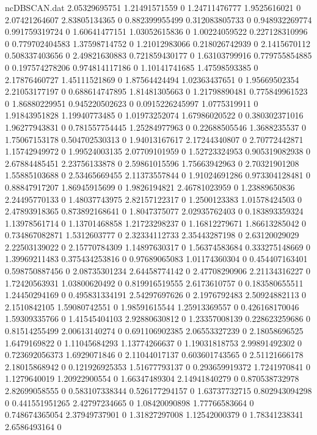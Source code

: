 \begin{filecontents}{ncDBSCAN.dat}
2.05329695751 1.21491571559 0
1.24711476777 1.9525616021 0
2.07421264607 2.83805134365 0
0.882399955499 0.312083805733 0
0.948932269774 0.991759319724 0
1.60641477151 1.03052615836 0
1.00224059522 0.227128310996 0
0.779702404583 1.37598714752 0
1.21012983066 0.218026742939 0
2.1415670112 0.508337403656 0
2.49821630883 0.721859430177 0
1.63103799916 0.779755854885 0
0.197574278206 0.974814117186 0
1.10141741685 1.47598593385 0
2.17876460727 1.45111521869 0
1.87564424494 1.02363437651 0
1.95669502354 2.21053177197 0
0.688614747895 1.81481305663 0
1.21798890481 0.775849961523 0
1.86880229951 0.945220502623 0
0.0915226245997 1.0775319911 0
1.91843951828 1.19940773485 0
1.01973252074 1.67986020522 0
0.380302371016 1.96277943831 0
0.781557754445 1.25284977963 0
0.22688505546 1.3688235537 0
1.75067153178 0.504702530313 0
1.94013167617 2.17244340807 0
2.70772442871 1.15742949972 0
1.99524003135 2.07709101959 0
1.52723324953 0.905319082938 0
2.67884485451 2.23756133878 0
2.59861015596 1.75663942963 0
2.70321901208 1.55885103688 0
2.53465669455 2.11373557844 0
1.91024691286 0.973304128481 0
0.88847917207 1.86945915699 0
1.9826194821 2.46781023959 0
1.23889650836 2.24495770133 0
1.48037743975 2.82157122317 0
1.2500123383 1.01578424503 0
2.47893918365 0.873892168641 0
1.8047375077 2.02935762403 0
0.183893359324 1.13978561714 0
1.13701468858 1.21723298237 0
1.16812279671 1.86613285042 0
0.734867082871 1.5312603777 0
2.32334112733 2.35443287198 0
2.63120029029 2.22503139022 0
2.15770784309 1.14897630317 0
1.56374583684 0.333275148669 0
1.39969211483 0.375434253816 0
0.97689065083 1.01174360304 0
0.454407163401 0.598750887456 0
2.08735301234 2.64458774142 0
2.47708290906 2.21134316227 0
1.72420563931 1.03800620492 0
0.819916519555 2.6173610757 0
0.183580655511 1.24450294169 0
0.495831334191 2.54297697626 0
2.1976792483 2.50924882113 0
2.1510842105 1.59080742551 0
1.98591615544 1.25913369557 0
0.426168170046 1.59309335766 0
1.41545404103 2.92880630812 0
1.23357008139 0.228623259686 0
0.81514255499 2.00613140274 0
0.691106902385 2.06553327239 0
2.18058696525 1.6479169822 0
1.11045684293 1.13774266637 0
1.19031818753 2.99891492302 0
0.723692056373 1.6929071846 0
2.11044017137 0.603601743565 0
2.51121666178 2.18015868942 0
0.121926925353 1.51677793137 0
0.293659919372 1.7241970841 0
1.1279640019 1.20922900554 0
1.66347489304 2.14941840279 0
0.870538732978 2.82699058555 0
0.583107338344 0.526177294157 0
1.63737732715 0.802943094298 0
0.441551951265 2.42797234665 0
1.08420090898 1.77766583664 0
0.748674365054 2.37949737901 0
1.31827297008 1.12542000379 0
1.78341238341 2.6586493164 0

\end{filecontents}
